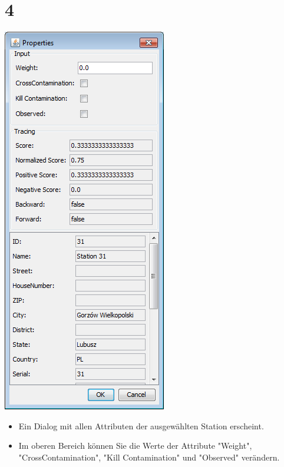 \documentclass{beamer}
\begin{document}
\section{4}
\begin{frame}
	\begin{center}
  		\includegraphics[height=0.6\textheight]{4.png}
	\end{center}
	\begin{itemize}
		\item Ein Dialog mit allen Attributen der ausgewählten Station erscheint.
		\item Im oberen Bereich können Sie die Werte der Attribute "Weight", "CrossContamination", "Kill Contamination" und "Observed" verändern.
	\end{itemize}
\end{frame}
\end{document}
